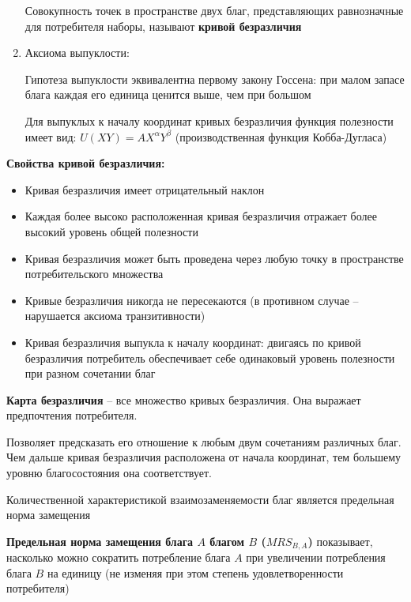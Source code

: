 \documentclass[reqno]{article}
\theoremstyle{definition}
\theoremstyle{definition}
\theoremstyle{definition}
\theoremstyle{definition}
\theoremstyle{definition}
\theoremstyle{definition}
\theoremstyle{definition}
\theoremstyle{definition}
\theoremstyle{definition}
\begin{document}
\begin{enumerate}
				Совокупность точек в пространстве двух благ, представляющих равнозначные для потребителя наборы, называют \textbf{кривой безразличия}
				
				\item Аксиома выпуклости: 
								
				Гипотеза выпуклости эквивалентна первому закону Госсена: при малом запасе блага каждая его единица ценится выше, чем при большом
				
				Для выпуклых к началу координат кривых безразличия функция полезности имеет вид: $U(XY) = AX^\alpha Y^\beta$ (производственная функция Кобба-Дугласа)
				
			\end{enumerate}
		
		\textbf{Свойства кривой безразличия:}
		\begin{itemize}
			\item Кривая безразличия имеет отрицательный наклон
			
			\item Каждая более высоко расположенная кривая безразличия отражает более высокий уровень общей полезности
			
			\item Кривая безразличия может быть проведена через любую точку в пространстве потребительского множества
			
			\item Кривые безразличия никогда не пересекаются (в противном случае – нарушается аксиома транзитивности)
			
			\item Кривая безразличия выпукла к началу координат: двигаясь по кривой безразличия потребитель обеспечивает себе одинаковый уровень полезности при разном сочетании благ
			
		\end{itemize} 
		
		\textbf{Карта безразличия} -- все множество кривых безразличия. Она выражает предпочтения потребителя.
		
		Позволяет предсказать его отношение к любым двум сочетаниям различных благ.
		Чем дальше кривая безразличия расположена от начала координат, тем большему уровню благосостояния она соответствует.
		
		Количественной характеристикой взаимозаменяемости благ является предельная норма замещения 
		
		\textbf{Предельная норма замещения блага $A$ благом $B$ ($MRS_{B, A}$)} показывает, насколько можно сократить потребление блага $A$ при увеличении потребления блага $B$ на единицу (не изменяя при этом степень удовлетворенности потребителя) 
		
\end{document}
